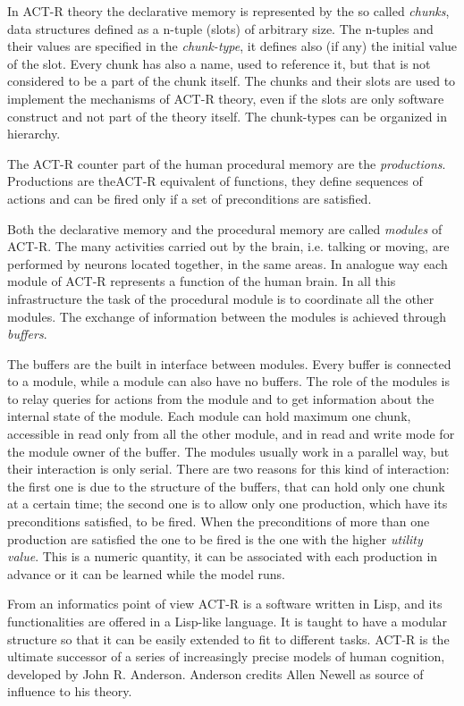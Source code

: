 In \mbox{ACT-R} theory the declarative memory is represented by the so called \emph{chunks}, data structures defined as a n-tuple (slots) of arbitrary size. The n-tuples and their values are specified in the \emph{chunk-type}, it defines also (if any) the initial value of the slot. Every chunk has also a name, used to reference it, but that is not considered to be a part of the chunk itself. The chunks and their slots are used to implement the mechanisms of \mbox{ACT-R} theory, even if the slots are only software construct and not part of the theory itself. The chunk-types can be organized in hierarchy.

The \mbox{ACT-R} counter part of the human procedural memory are the \emph{productions}. Productions are the\mbox{ACT-R} equivalent of functions, they define sequences of actions and can be fired only if a set of preconditions are satisfied. 

Both the declarative memory and the procedural memory are called \emph{modules} of \mbox{ACT-R}.  The many activities carried out by the brain, i.e. talking or moving, are performed by neurons located together, in the same areas. In analogue way each module of \mbox{ACT-R} represents a function of the human brain. In all this infrastructure the task of the procedural module is to coordinate all the other modules. The exchange of information between the modules is achieved through \emph{buffers}.

The buffers are the built in interface between modules. Every buffer is connected to a module, while a module can also have no buffers. The role of the modules is to relay queries for actions from the module and to get information about the internal state of the module. Each module can hold maximum one chunk, accessible in read only from all the other module, and in read and write mode for the module owner of the buffer. The modules usually work in a parallel way, but their interaction is only serial. There are two reasons for this kind of interaction: the first one is due to the structure of the buffers, that can hold only one chunk at a certain time; the second one is to allow only one production, which have its preconditions satisfied, to be fired. When the preconditions of more than one production are satisfied the one to be fired is the one with the higher \emph{utility value}. This is a numeric quantity, it can be associated with each production in advance or it can be learned while the model runs.

From an informatics point of view \mbox{ACT-R} is a software written in Lisp, and its functionalities are offered in a Lisp-like language. It is taught to have a modular structure so that it can be easily extended to fit to different tasks. \mbox{ACT-R} is the ultimate successor of a series of increasingly precise models of human cognition, developed by John R. Anderson. Anderson credits Allen Newell as source of influence to his theory.
